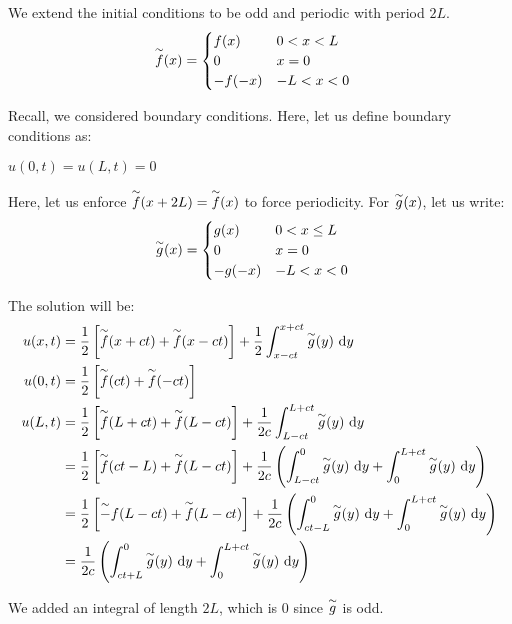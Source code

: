 We extend the initial conditions to be odd and periodic with period $2L$.
%
\begin{align}
  \overset{\sim}{f}(x) & =
  \begin{cases}
    f(x) & 0 < x < L\\
    0 & x = 0\\
    -f(-x) & -L < x < 0
  \end{cases}
\end{align}

Recall, we considered boundary conditions. Here, let us define boundary conditions as:
\begin{center}
  $u(0, t) = u(L, t) = 0$
\end{center}

Here, let us enforce $\overset{\sim}{f}(x + 2L) = \overset{\sim}{f}(x)$ to force periodicity. For $\overset{\sim}{g}(x)$, let us write:
%
\begin{align}
  \overset{\sim}{g}(x) & =
  \begin{cases}
    g(x) & 0 < x \leq L\\
    0 & x = 0\\
    -g(-x) & -L < x < 0
  \end{cases}
\end{align}

The solution will be:
%
\begin{align}
  u(x, t) & = \frac{1}{2}
  \left[ \overset{\sim}{f}(x + ct) + \overset{\sim}{f}(x - ct) \right] +
  \frac{1}{2} \int^{x + ct}_{x - ct} \overset{\sim}{g}(y)\ \text dy\\
  u(0, t) & = \frac{1}{2}
  \left[ \overset{\sim}{f}(ct) + \overset{\sim}{f}(-ct) \right]\\
  u(L, t) & = \frac{1}{2}
  \left[ \overset{\sim}{f}(L + ct) + \overset{\sim}{f}(L - ct) \right] +
  \frac{1}{2c} \int^{L + ct}_{L - ct} \overset{\sim}{g}(y)\ \text dy\\
  & = \frac{1}{2}
  \left[ \overset{\sim}{f}(ct - L) + \overset{\sim}{f}(L - ct) \right] +
  \frac{1}{2c} \left(
  \int^{0}_{L - ct} \overset{\sim}{g}(y)\ \text dy +
  \int^{L + ct}_{0} \overset{\sim}{g}(y)\ \text dy
  \right)\\
  & = \frac{1}{2}
  \left[ \overset{\sim}{-}f(L - ct) + \overset{\sim}{f}(L - ct) \right] +
  \frac{1}{2c} \left(
  \int^{0}_{ct - L} \overset{\sim}{g}(y)\ \text dy +
  \int^{L + ct}_{0} \overset{\sim}{g}(y)\ \text dy
  \right)\\
  & = \frac{1}{2c}
  \left(
  \int^0_{ct + L} \overset{\sim}{g}(y)\ \text dy+
  \int_0^{L + ct} \overset{\sim}{g}(y)\ \text dy
  \right)
\end{align}

We added an integral of length $2L$, which is $0$ since $\overset{\sim}{g}$ is odd.
